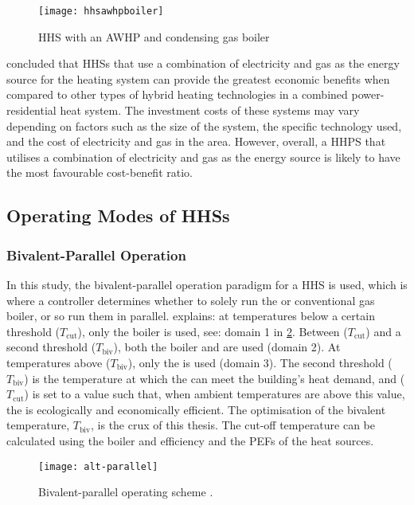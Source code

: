 \begin{figure}[htb]
    \centering
    \texttt{[image: hhsawhpboiler]}
    \caption{\acs{HHS} with an \acs{AWHP} and condensing gas boiler \cite{dongellini_influence_2021}}
    \label{fig:hhsawhpboilerdiagram}
\end{figure}

\citeauthor{heinen_electricity_2016} \cite{heinen_electricity_2016} concluded that \acp{HHS} that use a combination of electricity and gas as the energy source for the heating system can provide the greatest economic benefits when compared to other types of hybrid heating technologies in a combined power-residential heat system. The investment costs of these systems may vary depending on factors such as the size of the system, the specific technology used, and the cost of electricity and gas in the area. However, overall, a \ac{HHPS} that utilises a combination of electricity and gas as the energy source is likely to have the most favourable cost-benefit ratio.


\subsection{Operating Modes of \acsp{HHS}}

\subsubsection{Bivalent-Parallel Operation}
\label{subsubsec:biv-parallelop}
In this study, the bivalent-parallel operation paradigm for a \ac{HHS} is used, which is where a controller determines whether to solely run the \HP or conventional gas boiler, or so run them in parallel. \citeauthor{buday_2014} \cite{buday_2014} explains: at temperatures below a certain threshold ($T_\text{cut}$), only the boiler is used, see: domain 1 in \cref{fig:alt-parallel}. Between ($T_\text{cut}$) and a second threshold ($T_\text{biv}$), both the boiler and \HP are used (domain 2). At temperatures above ($T_\text{biv}$), only the \HP is used (domain 3). The second threshold ($T_\text{biv}$) is the temperature at which the \HP can meet the building's heat demand, and ($T_\text{cut}$) is set to a value such that, when ambient temperatures are above this value, the \HP is ecologically and economically efficient. The optimisation of the bivalent temperature, $T_\text{biv}$, is the crux of this thesis. The cut-off temperature can be calculated using the boiler and \HP efficiency and the \acp{PEF} of the heat sources. 
\begin{figure}[htb]
    \centering
    \texttt{[image: alt-parallel]}
    \caption{Bivalent-parallel operating scheme \cite{klein_numerical_2014}.}
    \label{fig:alt-parallel}
\end{figure}

